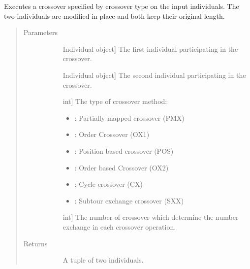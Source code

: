 \documentclass[letterpaper,10pt,english]{sphinxmanual}
\begin{document}
\begin{fulllineitems}
\label{\detokenize{pygace:pygace.ga.gaceCrossover}}
Executes a crossover specified by crossover type  on the input  individuals.
The two individuals are modified in place and both keep their original
length.
\begin{quote}\begin{description}
\item[{Parameters}] \leavevmode\begin{description}
\item[{}] \leavevmode{[}Individual object{]}
The first individual participating in the crossover.

\item[{}] \leavevmode{[}Individual object{]}
The second individual participating in the crossover.

\item[{}] \leavevmode{[}int{]}
The type of crossover method:
\begin{itemize}
\item {} 
: Partially-mapped crossover (PMX)

\item {} 
: Order Crossover (OX1)

\item {} 
: Position based crossover (POS)

\item {} 
: Order based Crossover (OX2)

\item {} 
: Cycle crossover (CX)

\item {} 
: Subtour exchange crossover (SXX)

\end{itemize}

\item[{}] \leavevmode{[}int{]}
The number of crossover which determine the number exchange in each
crossover operation.

\end{description}

\item[{Returns}] \leavevmode\begin{description}
\item[{}] \leavevmode
A tuple of two individuals.

\end{description}

\end{description}\end{quote}

\end{fulllineitems}
\end{document}
